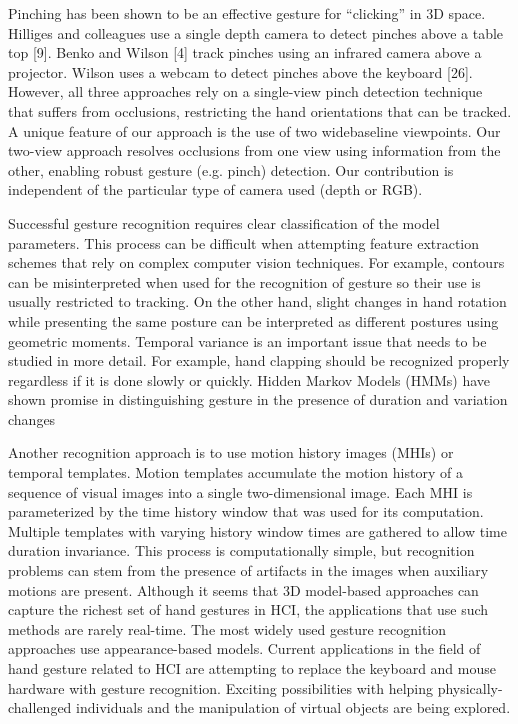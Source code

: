 

Pinching has been shown to be an effective gesture for “clicking”
in 3D space. Hilliges and colleagues use a single depth
camera to detect pinches above a table top [9]. Benko and
Wilson [4] track pinches using an infrared camera above a
projector. Wilson uses a webcam to detect pinches above
the keyboard [26]. However, all three approaches rely on
a single-view pinch detection technique that suffers from occlusions,
restricting the hand orientations that can be tracked.
A unique feature of our approach is the use of two widebaseline
viewpoints. Our two-view approach resolves occlusions
from one view using information from the other, enabling
robust gesture (e.g. pinch) detection. Our contribution
is independent of the particular type of camera used (depth
or RGB).

Successful gesture recognition requires clear classification of the model parameters. This process can be difficult when attempting feature extraction schemes that rely on complex computer vision techniques. For example, contours can be misinterpreted when used for the recognition of gesture so their use is usually restricted to tracking. On the other hand, slight changes in hand rotation while presenting the same posture can be interpreted as different postures using geometric moments. Temporal variance is an important issue that needs to be studied in more detail. For example, hand clapping should be recognized properly regardless if it is done slowly or quickly. Hidden Markov Models (HMMs) have shown promise in distinguishing gesture in the presence of duration and variation changes

Another recognition approach is to use motion history images (MHIs) or temporal templates. Motion templates accumulate the motion history of a sequence of visual images into a single two-dimensional image. Each MHI is parameterized by the time history window that was used for its computation. Multiple templates with varying history window times are gathered to allow time duration invariance. This process is computationally simple, but recognition problems can stem from the presence of artifacts in the images when auxiliary motions are present. Although it seems that 3D model-based approaches can capture the richest set of hand gestures in HCI, the applications that use such methods are rarely real-time. The most widely used gesture recognition approaches use appearance-based models. Current applications in the field of hand gesture related to HCI are attempting to replace the keyboard and mouse hardware with gesture recognition. Exciting possibilities with helping physically-challenged individuals and the manipulation of virtual objects are being explored.



